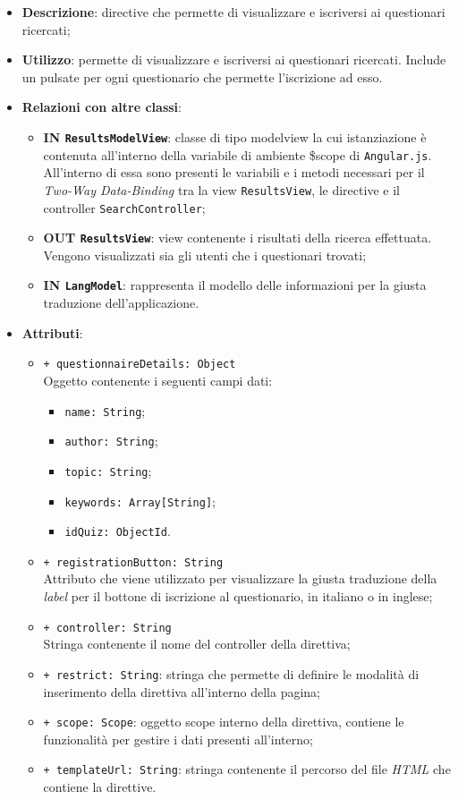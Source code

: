 \begin{itemize}
	\item \textbf{Descrizione}: directive che permette di visualizzare e iscriversi ai questionari ricercati;
	\item \textbf{Utilizzo}: permette di visualizzare e iscriversi ai questionari ricercati. Include un pulsate per ogni questionario che permette l'iscrizione ad esso.
	\item \textbf{Relazioni con altre classi}:
	\begin{itemize}
		\item \textbf{IN \texttt{ResultsModelView}}: classe di tipo modelview la cui istanziazione è contenuta all'interno della variabile di ambiente \$scope di \texttt{Angular.js}. All'interno di essa sono presenti le variabili e i metodi necessari per il \textit{Two-Way Data-Binding} tra la view \texttt{ResultsView}, le directive e il controller \texttt{SearchController};
		\item \textbf{OUT \texttt{ResultsView}}: view contenente i risultati della ricerca effettuata. Vengono visualizzati sia gli utenti che i questionari trovati;
		\item \textbf{IN \texttt{LangModel}}: rappresenta il modello delle informazioni per la giusta traduzione dell'applicazione.
	\end{itemize}
	\item \textbf{Attributi}:
	\begin{itemize}
		\item \texttt{+ questionnaireDetails: Object} \\ Oggetto contenente i seguenti campi dati:
			\begin{itemize}
				\item \texttt{name: String};
				\item \texttt{author: String};
				\item \texttt{topic: String};
				\item \texttt{keywords: Array[String]};
				\item \texttt{idQuiz: ObjectId}.
			\end{itemize}
		\item \texttt{+ registrationButton: String} \\ Attributo che viene utilizzato per visualizzare la giusta traduzione della \textit{label} per il bottone di iscrizione al questionario, in italiano o in inglese;
		\item \texttt{+ controller: String} \\ Stringa contenente il nome del controller della direttiva;
		\item \texttt{+ restrict: String}: stringa che permette di definire le modalità di inserimento della direttiva all'interno della pagina;
		\item \texttt{+ scope: Scope}: oggetto scope interno della direttiva, contiene le funzionalità per gestire i dati presenti all'interno;
		\item \texttt{+ templateUrl: String}: stringa contenente il percorso del file \textit{HTML} che contiene la direttive.
	\end{itemize}
\end{itemize}
